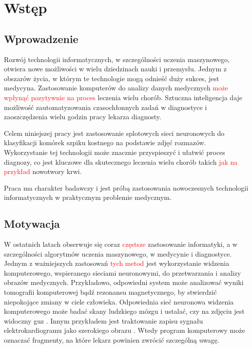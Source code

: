\chapter{Wstęp}


\section{Wprowadzenie}

Rozwój technologii informatycznych, w szczególności uczenia maszynowego, otwiera nowe możliwości w wielu dziedzinach nauki i przemysłu.
Jednym z obszarów życia, w którym te technologie mogą odnieść duży sukces, jest medycyna.
Zastosowanie komputerów do analizy danych medycznych \textcolor{red}{może wpłynąć pozytywnie na proces} leczenia wielu chorób.
Sztuczna inteligencja daje możliwość zautomatyzowania czasochłonnych zadań w diagnostyce i zaoszczędzenia wielu godzin pracy lekarza diagnosty.

Celem niniejszej pracy jest zastosowanie splotowych sieci neuronowych do klasyfikacji komórek szpiku kostnego na podstawie zdjęć rozmazów.
Wykorzystanie tej technologii może znacznie przyspieszyć i ułatwić proces diagnozy, co jest kluczowe dla skutecznego leczenia wielu chorób takich \textcolor{red}{jak na przykład} nowotwory krwi.

Praca ma charakter badawczy i jest próbą zastosowania nowoczesnych technologii informatycznych w praktycznym problemie medycznym.


\section{Motywacja}

W ostatnich latach obserwuje się coraz \textcolor{red}{częstsze} zastosowanie informatyki, a w szczególności algorytmów uczenia maszynowego,
w medycynie i diagnostyce.
Jednym z ważniejszych zastosowań \textcolor{red}{tych metod} jest wykorzystanie widzenia komputerowego, wspieranego sieciami neuronowymi, do przetwarzania i analizy obrazów medycznych.
Przykładowo, odpowiedni system może analizować wyniki tomografii komputerowej bądź rezonansu magnetycznego, by stwierdzić niepokojące zmiany w ciele człowieka.
Odpowiednia sieć neuronowa widzenia komputerowego może badać skany ludzkiego mózgu i ustalać, czy na zdjęciu jest widoczny guz \cite{brain_tumor}.
Innym przykładem jest traktowanie zapisu sygnału elektrokardiogramu jako szerokiego
obrazu \cite{ecg_cnn}.
Wtedy program komputerowy może oznaczać fragmenty, na które lekarz powinien zwrócić szczególną uwagę.

